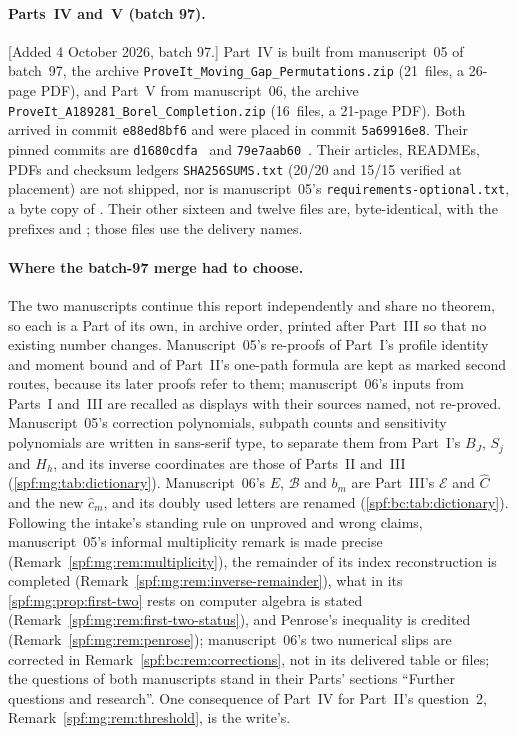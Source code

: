 \documentclass[11pt]{article}
\numberwithin{equation}{section}
\theoremstyle{definition}
\theoremstyle{remark}
\theoremstyle{definition}
\begin{document}
\paragraph{Parts~IV and~V (batch 97).}
[Added 4 October 2026, batch 97.] Part~IV is built from manuscript~05 of
batch~97, the archive \nolinkurl{ProveIt_Moving_Gap_Permutations.zip}
(21~files, a 26-page PDF), and Part~V from manuscript~06, the archive
\nolinkurl{ProveIt_A189281_Borel_Completion.zip} (16~files, a 21-page PDF).
Both arrived in commit \texttt{e88ed8bf6} and were placed in commit
\texttt{5a69916e8}. Their pinned commits are
\texttt{d1680cdfa}~\cite{mgProveIt} and \texttt{79e7aab60}~\cite{bcProveIt}.
Their articles, READMEs, PDFs and checksum ledgers \texttt{SHA256SUMS.txt}
(20/20 and 15/15 verified at placement) are not shipped, nor is
manuscript~05's \texttt{requirements-optional.txt}, a byte copy of
. Their other sixteen and twelve
files are, byte-identical, with the prefixes  and
; those files use the delivery names.

\paragraph{Where the batch-97 merge had to choose.} The two manuscripts
continue this report independently and share no theorem, so each is a Part
of its own, in archive order, printed after Part~III so that no existing
number changes. Manuscript~05's re-proofs of Part~I's profile identity and
moment bound and of Part~II's one-path formula are kept as marked second
routes, because its later proofs refer to them; manuscript~06's inputs from
Parts~I and~III are recalled as displays with their sources named, not
re-proved. Manuscript~05's correction polynomials, subpath counts and
sensitivity polynomials are written in sans-serif type, to separate them from
Part~I's $B_J$, $S_j$ and $H_h$, and its inverse coordinates are those of
Parts~II and~III (\cref{spf:mg:tab:dictionary}). Manuscript~06's $E$,
$\mathcal B$ and $b_m$ are Part~III's $\mathcal E$ and $\widehat C$ and the
new $\hat c_m$, and its doubly used letters are renamed
(\cref{spf:bc:tab:dictionary}). Following the intake's standing rule on
unproved and wrong claims, manuscript~05's informal multiplicity remark is
made precise (Remark~\ref{spf:mg:rem:multiplicity}), the remainder of its
index reconstruction is completed (Remark~\ref{spf:mg:rem:inverse-remainder}),
what in its \cref{spf:mg:prop:first-two} rests on computer algebra is stated
(Remark~\ref{spf:mg:rem:first-two-status}), and Penrose's inequality is
credited (Remark~\ref{spf:mg:rem:penrose}); manuscript~06's two numerical
slips are corrected in Remark~\ref{spf:bc:rem:corrections}, not in its
delivered table or files; the questions of both manuscripts stand in their
Parts' sections ``Further questions and research''. One consequence of
Part~IV for Part~II's question~2, Remark~\ref{spf:mg:rem:threshold}, is the
write's.
\end{document}
